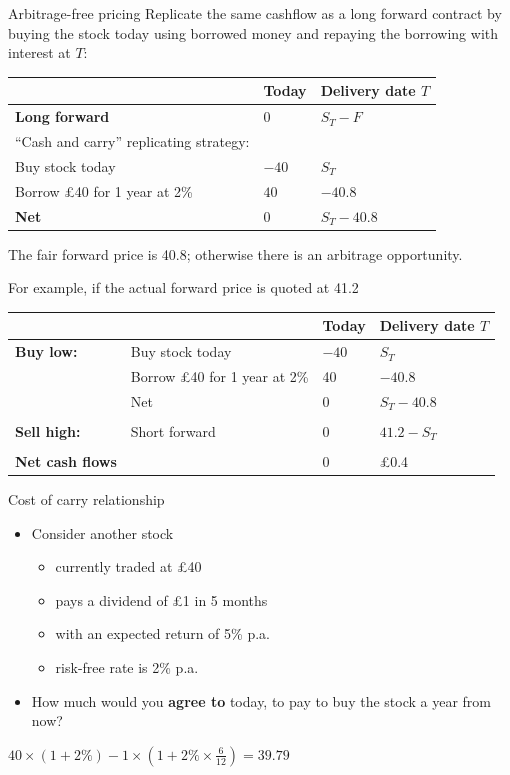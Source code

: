 \documentclass[
  ignorenonframetext,
  aspectratio=169]{beamer}
\providecommand{\tightlist}{%
  \setlength{\itemsep}{0pt}\setlength{\parskip}{0pt}}
\begin{document}
\begin{frame}{Arbitrage-free pricing}
\protect\hypertarget{arbitrage-free-pricing}{}
Replicate the same cashflow as a long forward contract by buying the
stock today using borrowed money and repaying the borrowing with
interest at \(T\):

\begin{longtable}[]{@{}lll@{}}
\toprule
& Today & \textbf{Delivery date} \(T\) \\
\midrule
\endhead
\textbf{Long forward} & 0 & \(S_T-F\) \\
``Cash and carry'' replicating strategy: & & \\
Buy stock today & \(-40\) & \(S_T\) \\
Borrow £40 for 1 year at 2\% & \(40\) & \(-40.8\) \\
\textbf{Net} & 0 & \(S_T-40.8\) \\
\bottomrule
\end{longtable}
\end{frame}

\begin{frame}
The fair forward price is 40.8; otherwise there is an arbitrage
opportunity.

For example, if the actual forward price is quoted at 41.2

\begin{longtable}[]{@{}llll@{}}
\toprule
& & Today & \textbf{Delivery date} \(T\) \\
\midrule
\endhead
\textbf{Buy low:} & Buy stock today & \(-40\) & \(S_T\) \\
& Borrow £40 for 1 year at 2\% & 40 & \(-40.8\) \\
& Net & 0 & \(S_T-40.8\) \\
& & & \\
\textbf{Sell high:} & Short forward & 0 & \(41.2-S_T\) \\
& & & \\
\textbf{Net cash flows} & & 0 & £0.4 \\
\bottomrule
\end{longtable}
\end{frame}

\begin{frame}{Cost of carry relationship}
\protect\hypertarget{cost-of-carry-relationship}{}
\begin{itemize}
\item
  Consider another stock

  \begin{itemize}
  \tightlist
  \item
    currently traded at £40
  \item
    pays a dividend of £1 in 5 months
  \item
    with an expected return of 5\% p.a.
  \item
    risk-free rate is 2\% p.a.
  \end{itemize}
\item
  How much would you \textbf{agree to} today, to pay to buy the stock a
  year from now?
\end{itemize}

\(40 \times (1+2\%) - 1 \times (1+2\% \times \frac{6}{12}) = 39.79\)
\end{frame}
\end{document}
